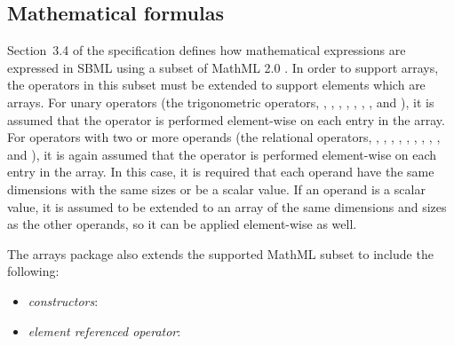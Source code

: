 \subsection{Mathematical formulas}
\label{math-formulas}
Section~3.4 of the \sbmlthreecore specification defines how mathematical expressions are expressed in SBML using a subset of MathML 2.0 \citep{w3c:2000b}.   In order to support arrays, the operators in this subset must be extended to support  elements which are arrays.   For unary operators (the trigonometric operators,  ,  ,  ,  ,  ,  ,  , and ), it is assumed that the operator is performed element-wise on each entry in the array.   For operators with two or more operands (the relational operators,  ,  ,  ,  ,  ,  ,  ,  ,  , and ), it is again assumed that the operator is performed element-wise on each entry in the array.   In this case, it is required that each operand have the same dimensions with the same sizes or be a scalar value.   If an operand is a scalar value, it is assumed to be extended to an array of the same dimensions and sizes as the other operands, so it can be applied element-wise as well.    

The arrays package also extends the supported MathML subset to include the following:
\begin{itemize}
\item \emph{constructors}:  
\item \emph{element referenced operator}:  
\end{itemize}

